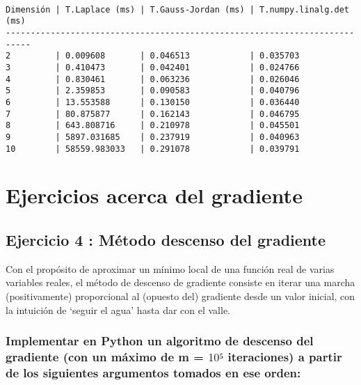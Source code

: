 \documentclass[11pt]{article}
\begin{document}
\begin{tcolorbox}[breakable, size=fbox, boxrule=1pt, pad at break*=1mm,colback=cellbackground, colframe=cellborder]
\begin{Verbatim}[commandchars=\\\{\}]
  
\end{Verbatim}
\end{tcolorbox}

    \begin{Verbatim}[commandchars=\\\{\}]
Dimensión | T.Laplace (ms) | T.Gauss-Jordan (ms) | T.numpy.linalg.det (ms)
---------------------------------------------------------------------------
2         | 0.009608       | 0.046513            | 0.035703
3         | 0.410473       | 0.042401            | 0.024766
4         | 0.830461       | 0.063236            | 0.026046
5         | 2.359853       | 0.090583            | 0.040796
6         | 13.553588      | 0.130150            | 0.036440
7         | 80.875877      | 0.162143            | 0.046795
8         | 643.808716     | 0.210978            | 0.045501
9         | 5897.031685    | 0.237919            | 0.040963
10        | 58559.983033   | 0.291078            | 0.039791
    \end{Verbatim}

    \section{Ejercicios acerca del
gradiente}\label{ejercicios-acerca-del-gradiente}

\subsection{Ejercicio 4 : Método descenso del
gradiente}\label{ejercicio-4-muxe9todo-descenso-del-gradiente}

Con el propósito de aproximar un mínimo local de una función real de
varias variables reales, el método de descenso de gradiente consiste en
iterar una marcha (positivamente) proporcional al (opuesto del)
gradiente desde un valor inicial, con la intuición de `seguir el agua'
hasta dar con el valle.

\subsubsection{\texorpdfstring{Implementar en Python un algoritmo de
descenso del gradiente (con un máximo de m = \(10⁵\) iteraciones) a
partir de los siguientes argumentos tomados en ese
orden:}{Implementar en Python un algoritmo de descenso del gradiente (con un máximo de m = 10⁵ iteraciones) a partir de los siguientes argumentos tomados en ese orden:}}\label{implementar-en-python-un-algoritmo-de-descenso-del-gradiente-con-un-muxe1ximo-de-m-10-iteraciones-a-partir-de-los-siguientes-argumentos-tomados-en-ese-orden}
\end{document}
